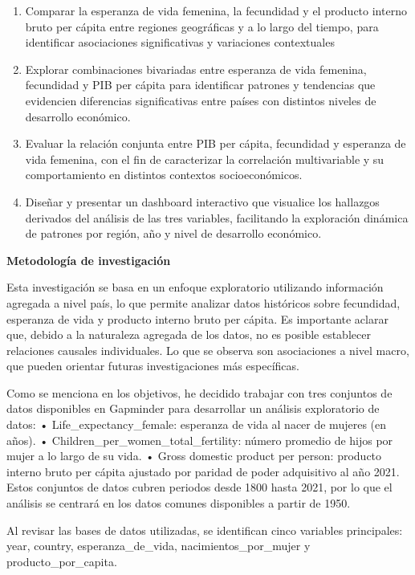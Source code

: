 \documentclass[
]{article}
\begin{document}
\begin{enumerate}
\def\labelenumi{\arabic{enumi}.}
\item
  Comparar la esperanza de vida femenina, la fecundidad y el producto
  interno bruto per cápita entre regiones geográficas y a lo largo del
  tiempo, para identificar asociaciones significativas y variaciones
  contextuales
\item
  Explorar combinaciones bivariadas entre esperanza de vida femenina,
  fecundidad y PIB per cápita para identificar patrones y tendencias que
  evidencien diferencias significativas entre países con distintos
  niveles de desarrollo económico.
\item
  Evaluar la relación conjunta entre PIB per cápita, fecundidad y
  esperanza de vida femenina, con el fin de caracterizar la correlación
  multivariable y su comportamiento en distintos contextos
  socioeconómicos.
\item
  Diseñar y presentar un dashboard interactivo que visualice los
  hallazgos derivados del análisis de las tres variables, facilitando la
  exploración dinámica de patrones por región, año y nivel de desarrollo
  económico.
\end{enumerate}

\textbf{Metodología de investigación}

Esta investigación se basa en un enfoque exploratorio utilizando
información agregada a nivel país, lo que permite analizar datos
históricos sobre fecundidad, esperanza de vida y producto interno bruto
per cápita. Es importante aclarar que, debido a la naturaleza agregada
de los datos, no es posible establecer relaciones causales individuales.
Lo que se observa son asociaciones a nivel macro, que pueden orientar
futuras investigaciones más específicas.

Como se menciona en los objetivos, he decidido trabajar con tres
conjuntos de datos disponibles en Gapminder para desarrollar un análisis
exploratorio de datos: • Life\_expectancy\_female: esperanza de vida al
nacer de mujeres (en años). • Children\_per\_women\_total\_fertility:
número promedio de hijos por mujer a lo largo de su vida. • Gross
domestic product per person: producto interno bruto per cápita ajustado
por paridad de poder adquisitivo al año 2021. Estos conjuntos de datos
cubren periodos desde 1800 hasta 2021, por lo que el análisis se
centrará en los datos comunes disponibles a partir de 1950.

Al revisar las bases de datos utilizadas, se identifican cinco variables
principales: year, country, esperanza\_de\_vida, nacimientos\_por\_mujer
y producto\_por\_capita.
\end{document}
